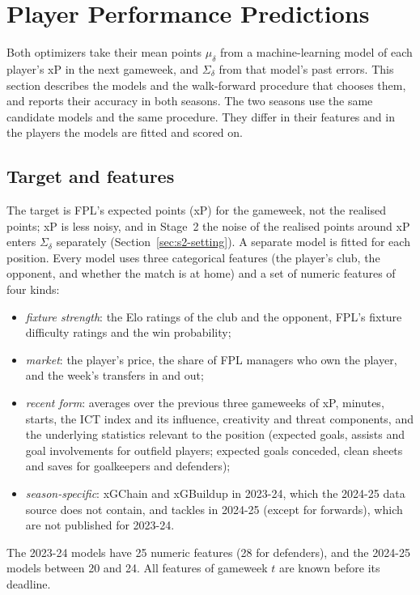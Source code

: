 \section{Player Performance Predictions}
\label{sec:predictions}

Both optimizers take their mean points $\mu_\delta$ from a machine-learning model of each
player's xP in the next gameweek, and $\Sigma_\delta$ from that model's past errors. This
section describes the models and the walk-forward procedure that chooses them, and reports
their accuracy in both seasons. The two seasons use the same candidate models and the same
procedure. They differ in their features and in the players the models are fitted and scored
on.

\subsection{Target and features}
\label{sec:predictions-features}

The target is FPL's expected points (xP) for the gameweek, not the realised points; xP is less
noisy, and in Stage~2 the noise of the realised points around xP enters $\Sigma_\delta$
separately (Section~\ref{sec:s2-setting}). A separate model is fitted for each position. Every model uses
three categorical features (the player's club, the opponent, and whether the match is at home)
and a set of numeric features of four kinds:
\begin{itemize}
  \item \emph{fixture strength}: the Elo ratings of the club and the opponent, FPL's fixture
  difficulty ratings and the win probability;
  \item \emph{market}: the player's price, the share of FPL managers who own the player,
  and the week's transfers in and out;
  \item \emph{recent form}: averages over the previous three gameweeks of xP, minutes, starts,
  the ICT index and its influence, creativity and threat components, and the underlying
  statistics relevant to the position (expected goals, assists and goal involvements for
  outfield players; expected goals conceded, clean sheets and saves for goalkeepers and
  defenders);
  \item \emph{season-specific}: xGChain and xGBuildup in 2023-24, which the 2024-25 data source
  does not contain, and tackles in 2024-25 (except for forwards), which are not published for
  2023-24.
\end{itemize}
The 2023-24 models have 25 numeric features (28 for defenders), and the 2024-25 models between
20 and 24. All features of gameweek $t$ are known before its deadline.

